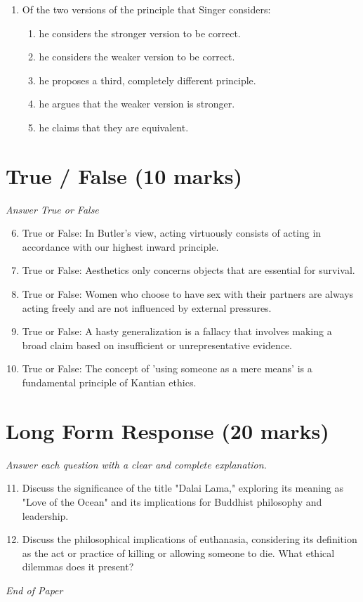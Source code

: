 \documentclass[12pt]{article}
\begin{document}
\begin{enumerate}[label=\arabic*.]
\begin{enumerate}[label=(\alph*)]
    \item autonomous
    \item consequential
    \item hypothetical
    \item practical
\end{enumerate}
\item Of the two versions of the principle that Singer considers:
\begin{enumerate}[label=(\alph*)]
    \item he considers the stronger version to be correct.
    \item he considers the weaker version to be correct.
    \item he proposes a third, completely different principle.
    \item he argues that the weaker version is stronger.
    \item he claims that they are equivalent.
\end{enumerate}
\end{enumerate}

\section*{True / False (10 marks)}
\textit{Answer True or False}
\begin{enumerate}[label=\arabic*.]
\setcounter{enumi}{5}
\item True or False: In Butler's view, acting virtuously consists of acting in accordance with our highest inward principle.
\item True or False: Aesthetics only concerns objects that are essential for survival.
\item True or False: Women who choose to have sex with their partners are always acting freely and are not influenced by external pressures.
\item True or False: A hasty generalization is a fallacy that involves making a broad claim based on insufficient or unrepresentative evidence.
\item True or False: The concept of 'using someone as a mere means' is a fundamental principle of Kantian ethics.
\end{enumerate}

\section*{Long Form Response (20 marks)}
\textit{Answer each question with a clear and complete explanation.}
\begin{enumerate}[label=\arabic*.]
\setcounter{enumi}{10}
\item Discuss the significance of the title "Dalai Lama," exploring its meaning as "Love of the Ocean" and its implications for Buddhist philosophy and leadership.
\item Discuss the philosophical implications of euthanasia, considering its definition as the act or practice of killing or allowing someone to die. What ethical dilemmas does it present?
\end{enumerate}

\vfill
\noindent\textit{End of Paper}
\end{document}
